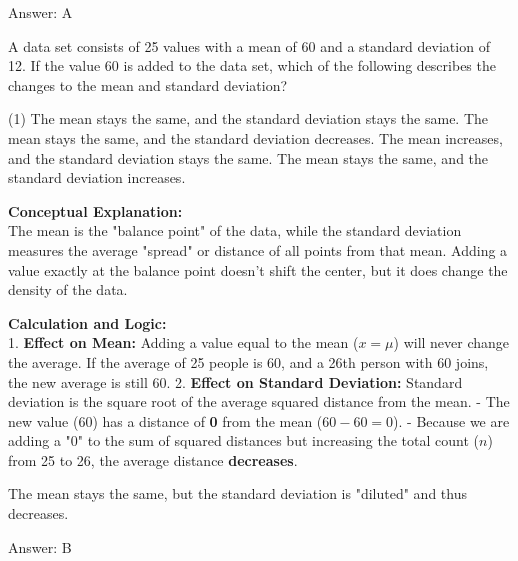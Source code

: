 \documentclass[11pt,paper=a4,answers]{exam}
\begin{document}
\begin{questions}
\begin{solution}
Answer: \colorbox{yellow!100}{A}
\end{solution}

\question
A data set consists of 25 values with a mean of 60 and a standard deviation of 12. If the value 60 is added to the data set, which of the following describes the changes to the mean and standard deviation?
\begin{tasks}(1)
    \task The mean stays the same, and the standard deviation stays the same.
    \task The mean stays the same, and the standard deviation decreases.
    \task The mean increases, and the standard deviation stays the same.
    \task The mean stays the same, and the standard deviation increases.
\end{tasks}

\begin{solution}
\textbf{Conceptual Explanation:} \\
The mean is the "balance point" of the data, while the standard deviation measures the average "spread" or distance of all points from that mean. Adding a value exactly at the balance point doesn't shift the center, but it does change the density of the data.

\vspace{30pt}

\textbf{Calculation and Logic:} \\
1. \textbf{Effect on Mean:} Adding a value equal to the mean ($x = \mu$) will never change the average. If the average of 25 people is 60, and a 26th person with 60 joins, the new average is still 60.
2. \textbf{Effect on Standard Deviation:} Standard deviation is the square root of the average squared distance from the mean. 
   - The new value (60) has a distance of \textbf{0} from the mean ($60 - 60 = 0$).
   - Because we are adding a "0" to the sum of squared distances but increasing the total count ($n$) from 25 to 26, the average distance \textbf{decreases}.

\vspace{20pt}

The mean stays the same, but the standard deviation is "diluted" and thus decreases.

\vspace{30pt}

Answer: \colorbox{yellow!100}{B}
\end{solution}

\vspace{60pt}


\end{questions}
\end{document}
